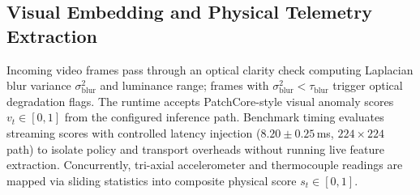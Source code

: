 \documentclass[conference]{IEEEtran}
\begin{document}
\subsection{Visual Embedding and Physical Telemetry Extraction}
Incoming video frames pass through an optical clarity check computing Laplacian blur variance $\sigma_{\mathrm{blur}}^2$ and luminance range; frames with $\sigma_{\mathrm{blur}}^2 < \tau_{\mathrm{blur}}$ trigger optical degradation flags. The runtime accepts PatchCore-style visual anomaly scores $v_t \in [0, 1]$ from the configured inference path. Benchmark timing evaluates streaming scores with controlled latency injection ($8.20 \pm 0.25$\,ms, $224 \times 224$ path) to isolate policy and transport overheads without running live feature extraction. Concurrently, tri-axial accelerometer and thermocouple readings are mapped via sliding statistics into composite physical score $s_t \in [0, 1]$.
\end{document}
